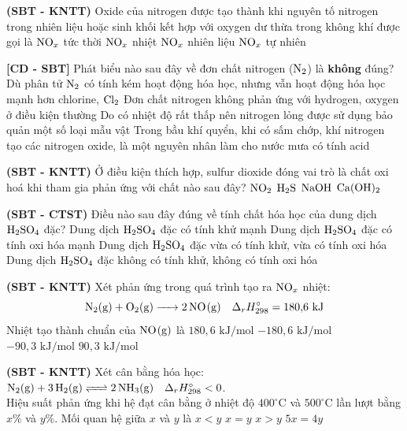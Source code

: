 \documentclass[12pt,a4paper]{article}
\begin{document}
\begin{ex}
\textbf{(SBT - KNTT)} Oxide của nitrogen được tạo thành khi nguyên tố nitrogen trong nhiên liệu hoặc sinh khối kết hợp với oxygen dư thừa trong không khí được gọi là
\choice
{$\ce{NO_x}$ tức thời}
{$\ce{NO_x}$ nhiệt}
{\True $\ce{NO_x}$ nhiên liệu}
{$\ce{NO_x}$ tự nhiên}

\end{ex}

\begin{ex}
\textbf{[CD - SBT]} Phát biểu nào sau đây về đơn chất nitrogen ($\ce{N2}$) là \textbf{không} đúng?
\choice
{\True Dù phân tử $\ce{N2}$ có tính kém hoạt động hóa học, nhưng vẫn hoạt động hóa học mạnh hơn chlorine, $\ce{Cl2}$}
{Đơn chất nitrogen không phản ứng với hydrogen, oxygen ở điều kiện thường}
{Do có nhiệt độ rất thấp nên nitrogen lỏng được sử dụng bảo quản một số loại mẫu vật}
{Trong bầu khí quyển, khi có sấm chớp, khí nitrogen tạo các nitrogen oxide, là một nguyên nhân làm cho nước mưa có tính acid}

\end{ex}

\begin{ex}
\textbf{(SBT - KNTT)} Ở điều kiện thích hợp, sulfur dioxide đóng vai trò là chất oxi hoá khi tham gia phản ứng với chất nào sau đây?
\choice
{$\ce{NO2}$}
{\True $\ce{H2S}$}
{$\ce{NaOH}$}
{$\ce{Ca(OH)2}$}

\end{ex}

\begin{ex}
\textbf{(SBT - CTST)} Điều nào sau đây đúng về tính chất hóa học của dung dịch $\ce{H2SO4}$ đặc?
\choice
{Dung dịch $\ce{H2SO4}$ đặc có tính khử mạnh}
{\True Dung dịch $\ce{H2SO4}$ đặc có tính oxi hóa mạnh}
{Dung dịch $\ce{H2SO4}$ đặc vừa có tính khử, vừa có tính oxi hóa}
{Dung dịch $\ce{H2SO4}$ đặc không có tính khử, không có tính oxi hóa}

\end{ex}

\begin{ex}
\textbf{(SBT - KNTT)} Xét phản ứng trong quá trình tạo ra $\ce{NO_x}$ nhiệt:
\[\ce{N2(g) + O2(g) -> 2NO(g)} \quad \Delta_r H^\circ_{298} = 180{,}6\text{ kJ}\]
Nhiệt tạo thành chuẩn của $\ce{NO(g)}$ là
\choice
{$180{,}6\text{ kJ/mol}$}
{$-180{,}6\text{ kJ/mol}$}
{$-90{,}3\text{ kJ/mol}$}
{\True $90{,}3\text{ kJ/mol}$}

\end{ex}

\begin{ex}
\textbf{(SBT - KNTT)} Xét cân bằng hóa học: $\ce{N2(g) + 3H2(g) <=> 2NH3(g)} \quad \Delta_r H^\circ_{298} < 0$.\\
Hiệu suất phản ứng khi hệ đạt cân bằng ở nhiệt độ $400^\circ\text{C}$ và $500^\circ\text{C}$ lần lượt bằng $x\%$ và $y\%$. Mối quan hệ giữa $x$ và $y$ là
\choice
{$x < y$}
{$x = y$}
{\True $x > y$}
{$5x = 4y$}

\end{ex}
\end{document}
